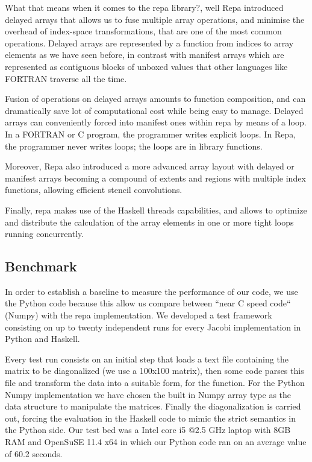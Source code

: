\documentclass{tmr}
\begin{document}
What that means when it comes to the repa library?, well Repa introduced
delayed arrays that allows us to fuse multiple array operations, and 
minimise the overhead of index-space transformations, that are one of the most
common operations. Delayed arrays are represented by a function from indices 
to array elements as we have seen before, in contrast with manifest arrays
which are represented as contiguous blocks of unboxed values that other 
languages like FORTRAN traverse all the time. 

Fusion of operations on delayed arrays amounts to function composition, and 
can dramatically save lot of computational cost while being easy to manage. 
Delayed arrays can conveniently forced into manifest ones within repa by means 
of a loop. In a FORTRAN or C program, the programmer writes explicit loops. 
In Repa, the programmer never writes loops; the loops are in library functions.

Moreover, Repa also introduced a more advanced array layout with delayed or manifest 
arrays becoming a compound of extents and regions with multiple index functions, 
allowing efficient stencil convolutions.

Finally, repa makes use of the Haskell threads capabilities, and allows to optimize and
distribute the calculation of the array elements in one or more tight loops running concurrently.


\subsection{Benchmark}

In order to establish a baseline to measure the performance of our code, 
we use the Python code because this allow us compare between ``near C speed code``
(Numpy) with the repa implementation. We developed a test framework consisting 
on up to twenty independent runs for every Jacobi implementation in Python and Haskell.

Every test run consists on an initial step that loads a text file containing
the matrix to be diagonalized (we use a 100x100 matrix), then some code parses
this file and transform the data into a suitable form, for the  function. 
For the Python Numpy implementation we have chosen the built in Numpy array type
as the data structure to manipulate the matrices. Finally the diagonalization is
carried out, forcing the evaluation in the Haskell code to mimic the strict 
semantics in the Python side. Our test bed was a Intel core i5 @2.5 GHz 
laptop with 8GB RAM and OpenSuSE 11.4 x64 in which our Python code 
ran on an average value of 60.2 seconds. 
\end{document}
